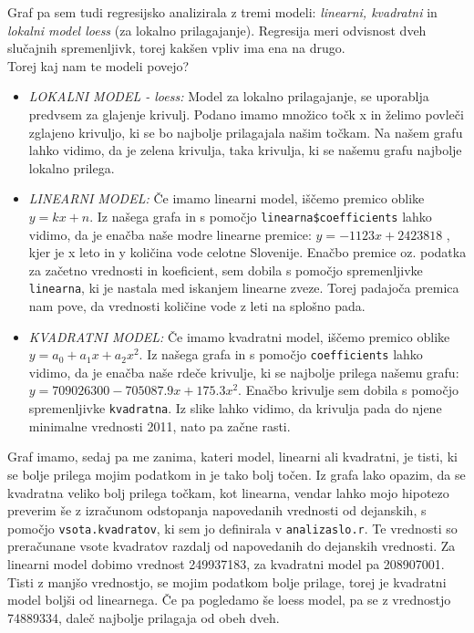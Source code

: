 \documentclass[11pt,a4paper]{article}
\begin{document}
Graf pa sem tudi regresijsko analizirala z tremi modeli: \emph{linearni, kvadratni} in \emph{lokalni model loess} (za lokalno prilagajanje). Regresija meri odvisnost dveh slučajnih spremenljivk, torej kakšen vpliv ima ena na drugo.\\
Torej kaj nam te modeli povejo?
\begin{itemize}
\item{\emph{LOKALNI MODEL - loess:} Model za lokalno prilagajanje, se uporablja predvsem za glajenje krivulj. Podano imamo množico točk x in želimo povleči zglajeno krivuljo, ki se bo najbolje prilagajala našim točkam. Na našem grafu lahko vidimo, da je zelena krivulja, taka krivulja, ki se našemu grafu najbolje lokalno prilega.}
\newpage
\item{\emph{LINEARNI MODEL:} Če imamo linearni model, iščemo premico oblike $y = kx + n$. Iz našega grafa in s pomočjo \verb|linearna$coefficients|  lahko vidimo, da je enačba naše modre linearne premice: $y = -1123x + 2423818$ , kjer je x leto in y količina vode celotne Slovenije. Enačbo premice oz. podatka za začetno vrednosti in koeficient, sem dobila s pomočjo spremenljivke \verb|linearna|, ki je nastala med iskanjem linearne zveze. Torej padajoča premica nam pove, da vrednosti količine vode z leti na splošno pada.}

\item{\emph{KVADRATNI MODEL:} Če imamo kvadratni model, iščemo premico oblike $y = a_0 + a_1x +a_2x^2$. Iz našega grafa in s pomočjo \verb|coefficients|  lahko vidimo, da je enačba naše rdeče krivulje, ki se najbolje prilega našemu grafu: $y = 709026300 - 705087.9x + 175.3x^2$. Enačbo krivulje sem dobila s pomočjo spremenljivke \verb|kvadratna|. Iz slike lahko vidimo, da krivulja pada do njene minimalne vrednosti 2011, nato pa začne rasti.}
\end{itemize}

Graf imamo, sedaj pa me zanima, kateri model, linearni ali kvadratni, je tisti, ki se bolje prilega mojim podatkom in je tako bolj točen. Iz grafa lako opazim, da se kvadratna veliko bolj prilega točkam, kot linearna, vendar lahko mojo hipotezo preverim še z izračunom odstopanja napovedanih vrednosti od dejanskih, s pomočjo \verb|vsota.kvadratov|, ki sem jo definirala v \verb|analizaslo.r|. Te vrednosti so preračunane vsote kvadratov razdalj od napovedanih do dejanskih vrednosti. Za linearni model dobimo vrednost 249937183, za kvadratni model pa 208907001. Tisti z manjšo vrednostjo, se mojim podatkom bolje prilage, torej je kvadratni model boljši od linearnega. Če pa pogledamo še loess model, pa se z vrednostjo 74889334, daleč najbolje prilagaja od obeh dveh.
\end{document}
